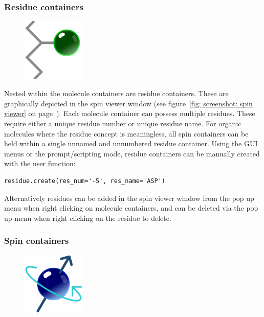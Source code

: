 \subsubsection{Residue containers}

\begin{figure}[h]
  \includegraphics[width=3cm, bb=0 0 1701 1701]{graphics/misc/residue_600x600}
\end{figure}

Nested within the molecule containers are residue containers.
These are graphically depicted in the spin viewer window (see figure~\ref{fig: screenshot: spin viewer} on page~\pageref{fig: screenshot: spin viewer}).
Each molecule container can possess multiple residues.
These require either a unique residue number or unique residue name.
For organic molecules where the residue concept is meaningless, all spin containers can be held within a single unnamed and unnumbered residue container.
Using the GUI menus or the prompt/scripting mode, residue containers can be manually created with the user function:

\begin{lstlisting}
residue.create(res_num='-5', res_name='ASP')
\end{lstlisting}

Alternatively residues can be added in the spin viewer window from the pop up menu when right clicking on molecule containers, and can be deleted via the pop up menu when right clicking on the residue to delete.



\newpage
\subsubsection{Spin containers}

\begin{figure}[h]
  \includegraphics[width=3cm, bb=0 0 1701 1701]{graphics/misc/spin_600x600}
\end{figure}

